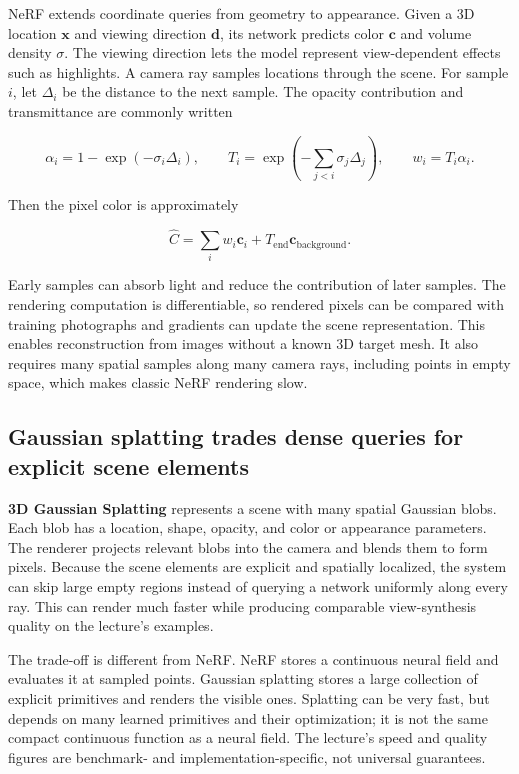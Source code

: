 NeRF extends coordinate queries from geometry to appearance. Given a 3D location \(\mathbf{x}\) and viewing direction \(\mathbf{d}\), its network predicts color \(\mathbf{c}\) and volume density \(\sigma\). The viewing direction lets the model represent view-dependent effects such as highlights. A camera ray samples locations through the scene. For sample \(i\), let \(\Delta_i\) be the distance to the next sample. The opacity contribution and transmittance are commonly written

\[
\alpha_i=1-\exp(-\sigma_i\Delta_i),\qquad
T_i=\exp\left(-\sum_{j<i}\sigma_j\Delta_j\right),\qquad
w_i=T_i\alpha_i.
\]

Then the pixel color is approximately

\[
\hat{C}=\sum_i w_i\mathbf{c}_i+T_{\text{end}}\mathbf{c}_{\text{background}}.
\]

Early samples can absorb light and reduce the contribution of later samples. The rendering computation is differentiable, so rendered pixels can be compared with training photographs and gradients can update the scene representation. This enables reconstruction from images without a known 3D target mesh. It also requires many spatial samples along many camera rays, including points in empty space, which makes classic NeRF rendering slow.

\subsection{Gaussian splatting trades dense queries for explicit scene elements}\label{04-visual-computing-ii-ch034-gaussian-splatting-trades-dense-queries-for-explicit-scene-elements}

\textbf{3D Gaussian Splatting} represents a scene with many spatial Gaussian blobs. Each blob has a location, shape, opacity, and color or appearance parameters. The renderer projects relevant blobs into the camera and blends them to form pixels. Because the scene elements are explicit and spatially localized, the system can skip large empty regions instead of querying a network uniformly along every ray. This can render much faster while producing comparable view-synthesis quality on the lecture's examples.

The trade-off is different from NeRF. NeRF stores a continuous neural field and evaluates it at sampled points. Gaussian splatting stores a large collection of explicit primitives and renders the visible ones. Splatting can be very fast, but depends on many learned primitives and their optimization; it is not the same compact continuous function as a neural field. The lecture's speed and quality figures are benchmark- and implementation-specific, not universal guarantees.

